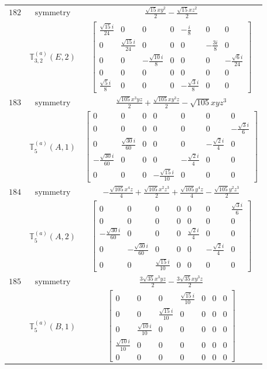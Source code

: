 \documentclass[fleqn,8pt,landscape]{jsarticle}
\begin{document}
\begin{longtable}{ccc}
$ 182 $ & $ \text{symmetry} $ & $ \frac{\sqrt{15} x y^{2}}{2} - \frac{\sqrt{15} x z^{2}}{2} $ \\
$  $ & $ \mathbb{T}_{3,2}^{(a)}(E,2) $ & $ \begin{bmatrix} \frac{\sqrt{15} i}{24} & 0 & 0 & 0 & - \frac{i}{8} & 0 & 0 \\ 0 & \frac{\sqrt{15} i}{24} & 0 & 0 & 0 & - \frac{3 i}{8} & 0 \\ 0 & 0 & - \frac{\sqrt{10} i}{8} & 0 & 0 & 0 & - \frac{\sqrt{6} i}{24} \\ 0 & 0 & 0 & 0 & 0 & 0 & 0 \\ \frac{\sqrt{5} i}{8} & 0 & 0 & 0 & - \frac{\sqrt{3} i}{8} & 0 & 0 \end{bmatrix} $ \\ \hline
$ 183 $ & $ \text{symmetry} $ & $ \frac{\sqrt{105} x^{3} y z}{2} + \frac{\sqrt{105} x y^{3} z}{2} - \sqrt{105} x y z^{3} $ \\
$  $ & $ \mathbb{T}_{5}^{(a)}(A,1) $ & $ \begin{bmatrix} 0 & 0 & 0 & 0 & 0 & 0 & 0 \\ 0 & 0 & 0 & 0 & 0 & 0 & - \frac{\sqrt{3} i}{6} \\ 0 & \frac{\sqrt{30} i}{60} & 0 & 0 & 0 & - \frac{\sqrt{2} i}{4} & 0 \\ - \frac{\sqrt{30} i}{60} & 0 & 0 & 0 & - \frac{\sqrt{2} i}{4} & 0 & 0 \\ 0 & 0 & 0 & - \frac{\sqrt{15} i}{10} & 0 & 0 & 0 \end{bmatrix} $ \\ \hline
$ 184 $ & $ \text{symmetry} $ & $ - \frac{\sqrt{105} x^{4} z}{4} + \frac{\sqrt{105} x^{2} z^{3}}{2} + \frac{\sqrt{105} y^{4} z}{4} - \frac{\sqrt{105} y^{2} z^{3}}{2} $ \\
$  $ & $ \mathbb{T}_{5}^{(a)}(A,2) $ & $ \begin{bmatrix} 0 & 0 & 0 & 0 & 0 & 0 & \frac{\sqrt{3} i}{6} \\ 0 & 0 & 0 & 0 & 0 & 0 & 0 \\ - \frac{\sqrt{30} i}{60} & 0 & 0 & 0 & \frac{\sqrt{2} i}{4} & 0 & 0 \\ 0 & - \frac{\sqrt{30} i}{60} & 0 & 0 & 0 & - \frac{\sqrt{2} i}{4} & 0 \\ 0 & 0 & \frac{\sqrt{15} i}{10} & 0 & 0 & 0 & 0 \end{bmatrix} $ \\ \hline
$ 185 $ & $ \text{symmetry} $ & $ \frac{3 \sqrt{35} x^{3} y z}{2} - \frac{3 \sqrt{35} x y^{3} z}{2} $ \\
$  $ & $ \mathbb{T}_{5}^{(a)}(B,1) $ & $ \begin{bmatrix} 0 & 0 & 0 & \frac{\sqrt{15} i}{10} & 0 & 0 & 0 \\ 0 & 0 & \frac{\sqrt{15} i}{10} & 0 & 0 & 0 & 0 \\ 0 & \frac{\sqrt{10} i}{10} & 0 & 0 & 0 & 0 & 0 \\ \frac{\sqrt{10} i}{10} & 0 & 0 & 0 & 0 & 0 & 0 \\ 0 & 0 & 0 & 0 & 0 & 0 & 0 \end{bmatrix} $ \\ \hline

\end{longtable}
\end{document}
